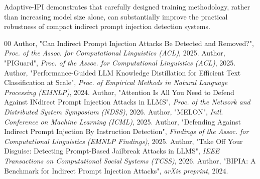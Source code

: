 \documentclass[conference]{IEEEtran}
\begin{document}
Adaptive-IPI demonstrates that carefully designed training methodology, rather than increasing model size alone, can substantially improve the practical robustness of compact indirect prompt injection detection systems.

\begin{thebibliography}{00}
 Author, "Can Indirect Prompt Injection Attacks Be Detected and Removed?", \textit{Proc. of the Assoc. for Computational Linguistics (ACL)}, 2025.
 Author, "PIGuard", \textit{Proc. of the Assoc. for Computational Linguistics (ACL)}, 2025.
 Author, "Performance-Guided LLM Knowledge Distillation for Efficient Text Classification at Scale", \textit{Proc. of Empirical Methods in Natural Language Processing (EMNLP)}, 2024.
 Author, "Attention Is All You Need to Defend Against INdirect Prompt Injection Attacks in LLMS", \textit{Proc. of the Network and Distributed System Symposium (NDSS)}, 2026.
 Author, "MELON", \textit{Intl. Conference on Machine Learning (ICML)}, 2025.
 Author, "Defending Against Indirect Prompt Injection By Instruction Detection", \textit{Findings of the Assoc. for Computational Linguistics (EMNLP Findings)}, 2025.
 Author, "Take Off Your Disguise: Detecting Prompt-Based Jailbreak Attacks in LLMS", \textit{IEEE Transactions on Computational Social Systems (TCSS)}, 2026.
 Author, "BIPIA: A Benchmark for Indirect Prompt Injection Attacks", \textit{arXiv preprint}, 2024.
\end{thebibliography}
\end{document}
